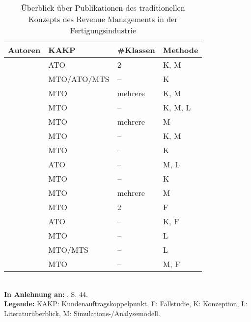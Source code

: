 \renewcommand{\arraystretch}{1.2}
\begin{table}[h!]
  \begin{center}
    \caption{Überblick über Publikationen des traditionellen Konzepts des Revenue Managements in der Fertigungsindustrie}  \label{Überblick}
    \vspace*{3mm}
    \begin{tabular}{llll}   %
     Autoren & KAKP  & \#Klassen & Methode  \\ \hline
     \cite{deBHarris1995299} &      ATO          &  2  &  K, M \\
      \cite{Kalyan:2002aa}      &      MTO/ATO/MTS          &  --  &  K \\
                \cite{rehkopf:2005aa}   &      MTO          &  mehrere &  K, M \\
                      \cite{rehkopf2007revenue}    &      MTO          &  --  &  K, M, L \\
                               \cite{Spengler:2007aa}   &    MTO            & mehrere & M  \\
                               \cite{Volling20121021} & MTO & -- & K, M \\
          \cite{kimms2005branchenverg} & MTO & -- & K \\
          \cite{guhlich2015revenue} & ATO & -- & M, L \\
          \cite{kolisch2006revenue} & MTO & -- & K \\
              \cite{DECI:DECI074}  &      MTO          &  mehrere  &  M \\
          \cite{kuhn2004revenue} & MTO & 2 & F \\
        \cite{Specht:2008aa} &        ATO    &  --  & K, F  \\
        \cite{quante2009revenue} & MTO & -- & L \\ 
        \cite{cheraghi2010revenue} & MTO/MTS & -- & L \\
        \cite{sucky2009revenue} & MTO & -- & M, F \\ \hline
    \end{tabular} \\[3mm]
    {\footnotesize \textbf{In Anlehnung an:} \cite{quante2009management}, S. 44.}\\
        {\footnotesize \textbf{Legende:} KAKP: Kundenauftragskoppelpunkt, F: Fallstudie, K: Konzeption, L: Literaturüberblick, M: Simulations-/Analysemodell. }   %
  \end{center}
\end{table}

